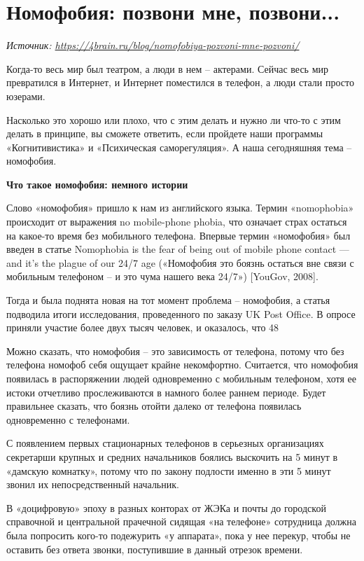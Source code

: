 \section{Номофобия: позвони мне, позвони...}

\textit{Источник: \url{https://4brain.ru/blog/nomofobiya-pozvoni-mne-pozvoni/}}

Когда-то весь мир был театром, а люди в нем – актерами. Сейчас весь мир превратился в Интернет, и Интернет поместился в телефон, а люди стали просто юзерами.

Насколько это хорошо или плохо, что с этим делать и нужно ли что-то с этим делать в принципе, вы сможете ответить, если пройдете наши программы «Когнитивистика» и «Психическая саморегуляция». А наша сегодняшняя тема – номофобия.

\textbf{Что такое номофобия: немного истории}

Слово «номофобия» пришло к нам из английского языка. Термин «nomophobia» происходит от выражения no mobile-phone phobia, что означает страх остаться на какое-то время без мобильного телефона. Впервые термин «номофобия» был введен в статье Nomophobia is the fear of being out of mobile phone contact — and it’s the plague of our 24/7 age («Номофобия это боязнь остаться вне связи с мобильным телефоном – и это чума нашего века 24/7») [YouGov, 2008].

Тогда и была поднята новая на тот момент проблема – номофобия, а статья подводила итоги исследования, проведенного по заказу UK Post Office. В опросе приняли участие более двух тысяч человек, и оказалось, что 48%

Можно сказать, что номофобия – это зависимость от телефона, потому что без телефона номофоб себя ощущает крайне некомфортно. Считается, что номофобия появилась в распоряжении людей одновременно с мобильным телефоном, хотя ее истоки отчетливо прослеживаются в намного более раннем периоде. Будет правильнее сказать, что боязнь отойти далеко от телефона появилась одновременно с телефонами.

С появлением первых стационарных телефонов в серьезных организациях секретарши крупных и средних начальников боялись выскочить на 5 минут в «дамскую комнатку», потому что по закону подлости именно в эти 5 минут звонил их непосредственный начальник.

В «доцифровую» эпоху в разных конторах от ЖЭКа и почты до городской справочной и центральной прачечной сидящая «на телефоне» сотрудница должна была попросить кого-то подежурить «у аппарата», пока у нее перекур, чтобы не оставить без ответа звонки, поступившие в данный отрезок времени.

